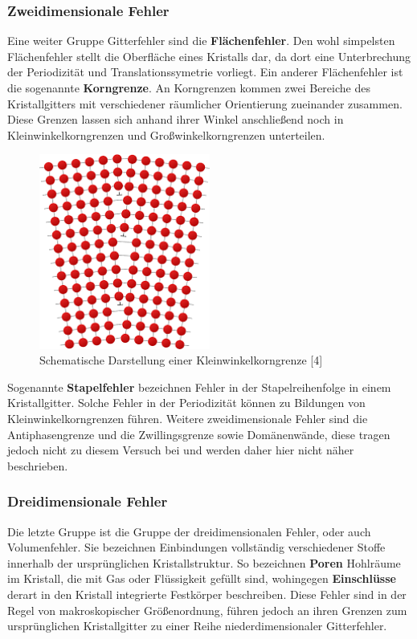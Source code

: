         \subsubsection*{Zweidimensionale Fehler}
            Eine weiter Gruppe Gitterfehler sind die \textbf{Flächenfehler}. Den wohl simpelsten Flächenfehler
            stellt die Oberfläche eines Kristalls dar, da dort eine Unterbrechung der Periodizität und Translationssymetrie vorliegt.
            Ein anderer Flächenfehler ist die sogenannte \textbf{Korngrenze}. An Korngrenzen kommen zwei 
            Bereiche des Kristallgitters mit verschiedener räumlicher Orientierung zueinander zusammen. Diese Grenzen lassen sich anhand ihrer Winkel
            anschließend noch in Kleinwinkelkorngrenzen und Großwinkelkorngrenzen unterteilen.
            \begin{figure}[H]
                \centering
                \includegraphics[width=0.5\textwidth]{Images/Kleinwinkelkorngrenze.png}
                \caption{Schematische Darstellung einer Kleinwinkelkorngrenze [4]}
            \end{figure}
            Sogenannte \textbf{Stapelfehler} bezeichnen Fehler in der Stapelreihenfolge in einem Kristallgitter. Solche Fehler in der Periodizität
            können zu Bildungen von Kleinwinkelkorngrenzen führen.
            Weitere zweidimensionale Fehler sind die Antiphasengrenze und die Zwillingsgrenze sowie Domänenwände, diese tragen jedoch nicht
            zu diesem Versuch bei und werden daher hier nicht näher beschrieben.
        \subsubsection*{Dreidimensionale Fehler}
            Die letzte Gruppe ist die Gruppe der dreidimensionalen Fehler, oder auch Volumenfehler. Sie bezeichnen Einbindungen vollständig verschiedener Stoffe innerhalb der ursprünglichen
            Kristallstruktur. So bezeichnen \textbf{Poren} Hohlräume im Kristall, die mit Gas oder Flüssigkeit gefüllt sind, wohingegen
            \textbf{Einschlüsse} derart in den Kristall integrierte Festkörper beschreiben.
            Diese Fehler sind in der Regel von makroskopischer Größenordnung, führen jedoch an ihren Grenzen zum ursprünglichen Kristallgitter
            zu einer Reihe niederdimensionaler Gitterfehler.

